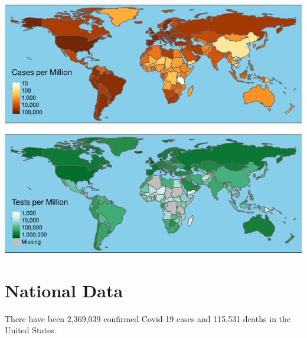 \documentclass[]{article}
\begin{document}
\includegraphics{covid_files/figure-latex/unnamed-chunk-5-1.pdf}

\includegraphics{covid_files/figure-latex/unnamed-chunk-6-1.pdf}

\newpage

\hypertarget{national-data}{%
\section{National Data}\label{national-data}}

There have been 2,369,039 confirmed Covid-19 cases and 115,531 deaths in
the United States.
\end{document}

